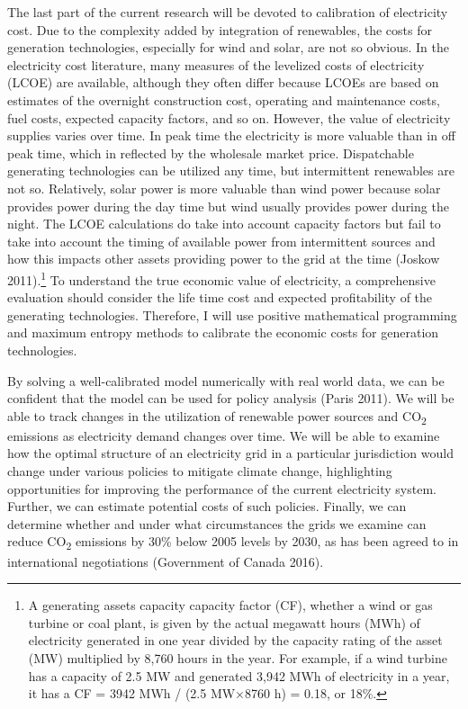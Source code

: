 \documentclass[10pt,letter]{article}
\begin{document}
The last part of the current research will be devoted to calibration of
electricity cost. Due to the complexity added by integration of
renewables, the costs for generation technologies, especially for wind
and solar, are not so obvious. In the electricity cost literature, many
measures of the levelized costs of electricity (LCOE) are available,
although they often differ because LCOEs are based on estimates of the
overnight construction cost, operating and maintenance costs, fuel
costs, expected capacity factors, and so on. However, the value of
electricity supplies varies over time. In peak time the electricity is
more valuable than in off peak time, which in reflected by the wholesale
market price. Dispatchable generating technologies can be utilized any
time, but intermittent renewables are not so. Relatively, solar power is
more valuable than wind power because solar provides power during the
day time but wind usually provides power during the night. The LCOE
calculations do take into account capacity factors but fail to take into
account the timing of available power from intermittent sources and how
this impacts other assets providing power to the grid at the time
(Joskow 2011).\footnote{A generating assets capacity capacity factor
  (CF), whether a wind or gas turbine or coal plant, is given by the
  actual megawatt hours (MWh) of electricity generated in one year
  divided by the capacity rating of the asset (MW) multiplied by 8,760
  hours in the year. For example, if a wind turbine has a capacity of
  2.5 MW and generated 3,942 MWh of electricity in a year, it has a CF =
  3942 MWh / (2.5 MW×8760 h) = 0.18, or 18\%.} To understand the true
economic value of electricity, a comprehensive evaluation should
consider the life time cost and expected profitability of the generating
technologies. Therefore, I will use positive mathematical programming
and maximum entropy methods to calibrate the economic costs for
generation technologies.

By solving a well-calibrated model numerically with real world data, we
can be confident that the model can be used for policy analysis (Paris
2011). We will be able to track changes in the utilization of renewable
power sources and CO\textsubscript{2} emissions as electricity demand
changes over time. We will be able to examine how the optimal structure
of an electricity grid in a particular jurisdiction would change under
various policies to mitigate climate change, highlighting opportunities
for improving the performance of the current electricity system.
Further, we can estimate potential costs of such policies. Finally, we
can determine whether and under what circumstances the grids we examine
can reduce CO\textsubscript{2} emissions by 30\% below 2005 levels by
2030, as has been agreed to in international negotiations (Government of
Canada 2016).
\end{document}
